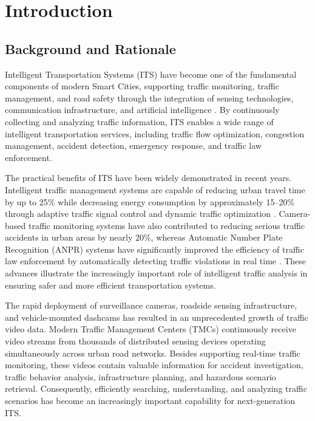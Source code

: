\documentclass[a4paper, 11pt]{article} %
\begin{document}
\setcounter{page}{2}
\newpage
\tableofcontents
\newpage
\listoffigures
\newpage
\listoftables
\newpage
\section{Introduction}
\subsection{Background and Rationale}

Intelligent Transportation Systems (ITS) have become one of the fundamental components of modern Smart Cities, supporting traffic monitoring, traffic management, and road safety through the integration of sensing technologies, communication infrastructure, and artificial intelligence \cite{hassan2021intelligent}. By continuously collecting and analyzing traffic information, ITS enables a wide range of intelligent transportation services, including traffic flow optimization, congestion management, accident detection, emergency response, and traffic law enforcement.

The practical benefits of ITS have been widely demonstrated in recent years. Intelligent traffic management systems are capable of reducing urban travel time by up to 25\% while decreasing energy consumption by approximately 15--20\% through adaptive traffic signal control and dynamic traffic optimization \cite{elassy2024intelligent}. Camera-based traffic monitoring systems have also contributed to reducing serious traffic accidents in urban areas by nearly 20\%, whereas Automatic Number Plate Recognition (ANPR) systems have significantly improved the efficiency of traffic law enforcement by automatically detecting traffic violations in real time \cite{hassan2021intelligent,elassy2024intelligent}. These advances illustrate the increasingly important role of intelligent traffic analysis in ensuring safer and more efficient transportation systems.

The rapid deployment of surveillance cameras, roadside sensing infrastructure, and vehicle-mounted dashcams has resulted in an unprecedented growth of traffic video data. Modern Traffic Management Centers (TMCs) continuously receive video streams from thousands of distributed sensing devices operating simultaneously across urban road networks. Besides supporting real-time traffic monitoring, these videos contain valuable information for accident investigation, traffic behavior analysis, infrastructure planning, and hazardous scenario retrieval. Consequently, efficiently searching, understanding, and analyzing traffic scenarios has become an increasingly important capability for next-generation ITS.
\end{document}

